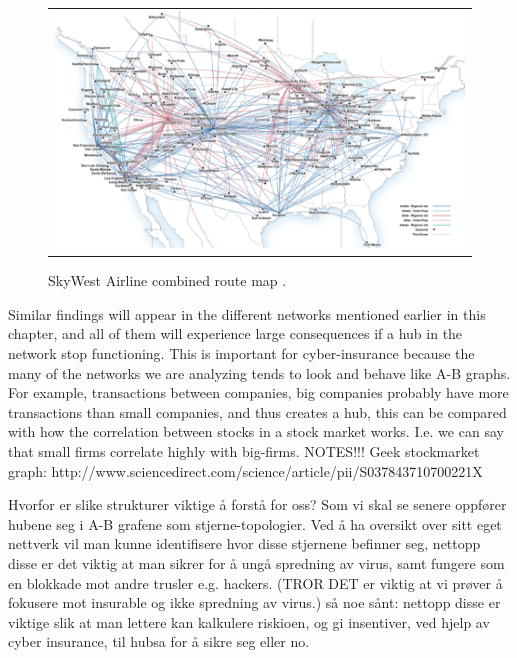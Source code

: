 \begin{figure}[h]
\centering
\begin{tabular}{@{}c@{}}
\includegraphics[width=1.0\textwidth]{../Figures/airlineRoutesUSA.png}
\end{tabular}
\caption[Caption for LOF]{SkyWest Airline combined route map \cite{airlineRoutes}.
\label{fig:airlineRouteMap}}
\end{figure}

Similar findings will appear in the different networks mentioned earlier in this chapter, and all of them will experience large consequences if a hub in the network stop functioning. This is important for cyber-insurance because the many of the networks we are analyzing tends to look and behave like A-B graphs. For example, transactions between companies, big companies probably have more transactions than small companies, and thus creates a hub, this can be compared with how the correlation between stocks in a stock market works. I.e. we can say that small firms correlate highly with big-firms. 
NOTES!!!
Geek stockmarket graph: http://www.sciencedirect.com/science/article/pii/S037843710700221X



Hvorfor er slike strukturer viktige å forstå for oss? 
Som vi skal se senere oppfører hubene seg i A-B grafene som stjerne-topologier. 
Ved å ha oversikt over sitt eget nettverk vil man kunne identifisere hvor disse stjernene befinner seg, nettopp disse er det viktig at man sikrer for å ungå spredning av virus, samt fungere som en blokkade mot andre trusler e.g. hackers. (TROR DET er viktig at vi prøver å fokusere mot insurable og ikke spredning av virus.)
så noe sånt:
nettopp disse er viktige slik at man lettere kan kalkulere riskioen, og gi insentiver, ved hjelp av cyber insurance, til hubsa for å sikre seg eller no.







